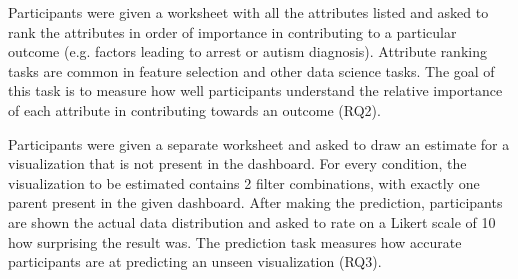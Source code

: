 Participants were given a worksheet with all the attributes listed and asked to rank the attributes in order of importance in contributing to a particular outcome (e.g. factors leading to arrest or autism diagnosis). Attribute ranking tasks are common in feature selection and other data science tasks. The goal of this task is to measure how well participants understand the relative importance of each attribute in contributing towards an outcome (RQ2).

 Participants were given a separate worksheet and asked to draw an estimate for a visualization that is not present in the dashboard. For every condition, the visualization to be estimated contains 2 filter combinations, with exactly one parent present in the given dashboard. After making the prediction, participants are shown the actual data distribution and asked to rate on a Likert scale of 10 how surprising the result was. The prediction task measures how accurate participants are at predicting an unseen visualization (RQ3).


